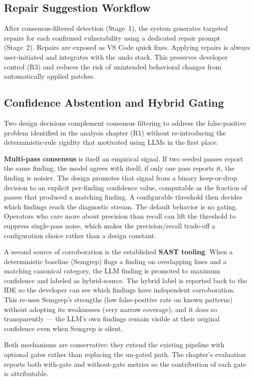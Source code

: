 \subsection{Repair Suggestion Workflow}
\label{subsec:repair-workflow}

After consensus-filtered detection (Stage~1), the system generates targeted repairs for each confirmed vulnerability using a dedicated repair prompt (Stage~2). Repairs are exposed as VS Code quick fixes. Applying repairs is always user-initiated and integrates with the undo stack. This preserves developer control (R3) and reduces the risk of unintended behavioral changes from automatically applied patches.

\subsection{Confidence Abstention and Hybrid Gating}
\label{subsec:confidence-abstention}

Two design decisions complement consensus filtering to address the false-positive problem identified in the analysis chapter (R1) without re-introducing the deterministic-rule rigidity that motivated using LLMs in the first place.

\textbf{Multi-pass consensus} is itself an empirical signal. If two seeded passes report the same finding, the model agrees with itself; if only one pass reports it, the finding is noisier. The design promotes that signal from a binary keep-or-drop decision to an explicit per-finding confidence value, computable as the fraction of passes that produced a matching finding. A configurable threshold then decides which findings reach the diagnostic stream. The default behavior is no gating. Operators who care more about precision than recall can lift the threshold to suppress single-pass noise, which makes the precision/recall trade-off a configuration choice rather than a design constant.

A second source of corroboration is the established \textbf{SAST tooling}. When a deterministic baseline (Semgrep) flags a finding on overlapping lines and a matching canonical category, the LLM finding is promoted to maximum confidence and labeled as hybrid-source. The hybrid label is reported back to the IDE so the developer can see which findings have independent corroboration. This re-uses Semgrep's strengths (low false-positive rate on known patterns) without adopting its weaknesses (very narrow coverage), and it does so transparently --- the LLM's own findings remain visible at their original confidence even when Semgrep is silent.

Both mechanisms are conservative: they extend the existing pipeline with optional gates rather than replacing the un-gated path. The chapter's evaluation reports both with-gate and without-gate metrics so the contribution of each gate is attributable.


